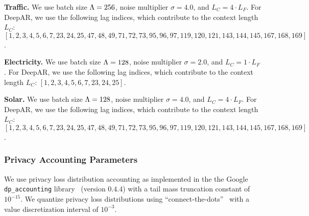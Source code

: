 \textbf{Traffic.} We use batch size $\Lambda=256$, noise multiplier $\sigma = 4.0$, and $L_C = 4 \cdot L_F$.
For DeepAR, we use the following lag indices, which contribute to the context length $L_C$:
$[1, 2, 3, 4, 5, 6, 7, 23, 24, 25, 47, 48, 49, 71, 72, 73,
            95, 96, 97, 119, 120, 121, 143, 144, 145, 167, 168, 169]$.

\textbf{Electricity.} We use batch size $\Lambda=128$, noise multiplier $\sigma = 2.0$, and $L_C = 1 \cdot L_F$.
For DeepAR, we use the following lag indices, which contribute to the context length $L_C$:
$[1, 2, 3, 4, 5, 6, 7, 23, 24, 25]$.

\textbf{Solar.} We use batch size $\Lambda=128$, noise multiplier $\sigma = 4.0$, and $L_C = 4 \cdot L_F$.
For DeepAR, we use the following lag indices, which contribute to the context length $L_C$:
$[1, 2, 3, 4, 5, 6, 7, 23, 24, 25, 47, 48, 49, 71, 72, 73,
            95, 96, 97, 119, 120, 121, 143, 144, 145, 167, 168, 169]$.


\subsubsection{Privacy Accounting Parameters}
We use
privacy loss distribution accounting as implemented in the 
the Google \texttt{dp\_accounting} library~\cite{dpaccountinglibrary} (version $0.4.4$)
with a tail mass truncation constant of  $10^{-15}$.
We quantize privacy loss distributions
using ``connect-the-dots''~\cite{doroshenko2022connect} with a value discretization interval of $10^{-3}$. 
